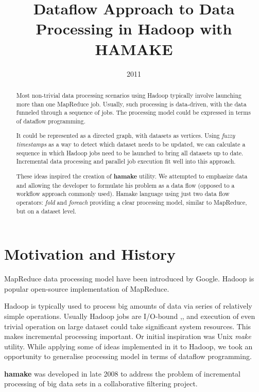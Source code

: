 \documentclass[10pt,conference,letterpaper]{IEEEtran}
\title{Dataflow Approach to Data Processing in Hadoop with HAMAKE}
\author{\IEEEauthorblockN{Vadim Zaliva}
\IEEEauthorblockA{Codeminders\\
Email: lord@crocodile.org} \and \IEEEauthorblockN{Vladimir Orlov}
\IEEEauthorblockA{Codeminders\\
Email: vorl@codeminders.com}}
\date{2011}
\begin{document}
\lstset{language=XML,basicstyle=\tiny,markfirstintag=true}

\maketitle

\begin{abstract}
  Most non-trivial data processing scenarios using Hadoop typically
  involve launching more than one MapReduce job. Usually, such
  processing is data-driven, with the data funneled through a sequence
  of jobs. The processing model could be expressed in terms of
  dataflow programming.
  
  It could be represented as a directed graph, with datasets as
  vertices. Using \textit{fuzzy timestamps} as a way to detect which
  dataset needs to be updated, we can calculate a sequence in which
  Hadoop jobs need to be launched to bring all datasets up to
  date. Incremental data processing and parallel job execution fit
  well into this approach.

  These ideas inspired the creation of \textbf{hamake} utility. We
  attempted to emphasize data and allowing the developer to formulate
  his problem as a data flow (opposed to a workflow approach commonly
  used). Hamake language using just two data flow operators:
  \emph{fold} and \emph{foreach} providing a clear processing model,
  similar to MapReduce, but on a dataset level.
\end{abstract}

\section{Motivation and History}

MapReduce data processing model have been introduced by
Google\cite{dean2008map}. Hadoop\cite{bialecki2005hadoop} is popular
open-source implementation of MapReduce.

Hadoop is typically used to process big amounts of data via series of
relatively simple operations. Usually Hadoop jobs are I/O-bound
\cite{hadoopattwitter},\cite{hs2010hadoopbench}, and execution of even
trivial operation on large dataset could take significant system
resources. This makes incremental processing important. Or initial
inspiration was Unix \emph{make} utility. While applying some of ideas
implemented in it to Hadoop, we took an opportunity to generalise
processing model in terms of dataflow programming.

\textbf{hamake} was developed in late 2008 to address the problem of
incremental processing of big data sets in a collaborative filtering
project.
\end{document}

